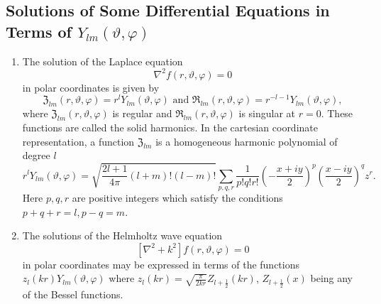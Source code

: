 \subsection{Solutions of Some Differential Equations in Terms of $Y_{l m}(\vartheta, \varphi)$}\label{sec:5.1.7}
\begin{enumerate}[label=(\alph*)]
  \item The solution of the Laplace equation
\begin{equation}
\nabla^{2} f(r, \vartheta, \varphi)=0 \label{eq:5:1:15}
\end{equation}
in polar coordinates is given by
\[
\mathfrak{Z}_{l m}(r, \vartheta, \varphi)=r^{l} Y_{l m}(\vartheta, \varphi) \text { and } \mathfrak{R}_{l m}(r, \vartheta, \varphi)=r^{-l-1} Y_{l m}(\vartheta, \varphi),
\]
where $\mathfrak{Z}_{l m}(r, \vartheta, \varphi)$ is regular and $\mathfrak{R}_{l m}(r, \vartheta, \varphi)$ is singular at $r=0$. These functions are called the solid harmonics. In the cartesian coordinate representation, a function $\mathfrak{Z}_{l m}$ is a homogeneous harmonic polynomial of degree $l$
\begin{equation}
r^{l} Y_{l m}(\vartheta, \varphi)=\sqrt{\frac{2 l+1}{4 \pi}(l+m)!(l-m)!} \sum_{p, q, r} \frac{1}{p!q!r!}\left(-\frac{x+i y}{2}\right)^{p}\left(\frac{x-i y}{2}\right)^{q} z^{r} .\label{eq:5:1:16}
\end{equation}
Here $p, q, r$ are positive integers which satisfy the conditions $p+q+r=l, p-q=m$.\\
\item The solutions of the Helmholtz wave equation
\begin{equation}
\left[\nabla^{2}+k^{2}\right] f(r, \vartheta, \varphi)=0 \label{eq:5:1:17}
\end{equation}
in polar coordinates may be expressed in terms of the functions $z_{l}(k r) Y_{l m}(\vartheta, \varphi)$ where $z_{l}(k r)=\sqrt{\frac{\pi}{2 k r}} Z_{l+\frac{1}{2}}(k r)$, $Z_{l+\frac{1}{2}}(x)$ being any of the Bessel functions.


\end{enumerate}
